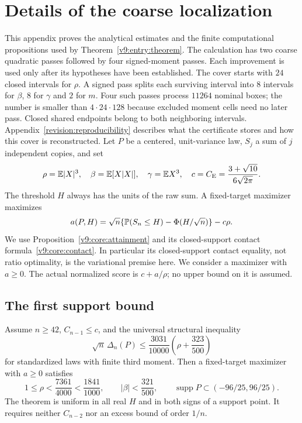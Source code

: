 \section{Details of the coarse localization}\label{revision:entry-details}

This appendix proves the analytical estimates and the finite
computational propositions used by Theorem~\ref{v9:entry:theorem}. The calculation has
two coarse quadratic passes followed by four signed-moment passes.
Each improvement is used only after its hypotheses have been established.
The cover starts with $24$ closed intervals for $\rho$. A signed pass
splits each surviving interval into $8$ intervals for $\beta$, $8$ for
$\gamma$ and $2$ for $m$. Four such passes process $11264$ nominal boxes;
the number is smaller than $4\cdot24\cdot128$ because excluded moment
cells need no later pass. Closed shared endpoints belong to both
neighboring intervals. Appendix~\ref{revision:reproducibility} describes
what the certificate stores and how this cover is reconstructed.
Let $P$ be a centered,
unit-variance law, $S_j$ a sum of $j$ independent copies, and set
\[
 \rho=\mathbb E|X|^3,\quad \beta=\mathbb E[X|X|],\quad \gamma=\mathbb E X^3,
 \quad c=C_{\mathrm E}=\frac{3+\sqrt{10}}{6\sqrt{2\pi}}.
\]
The threshold $H$ always has the units of the raw sum. A fixed-target
maximizer maximizes
\[
 a(P,H)=\sqrt n\{\mathbb P(S_n\le H)-\Phi(H/\sqrt n)\}-c\rho.
\]
We use Proposition~\ref{v9:core:attainment} and its closed-support
contact formula~\eqref{v9:core:contact}. In particular its closed-support contact
equality, not ratio optimality, is the variational premise here. We consider
a maximizer with $a\ge0$. The actual normalized score is $c+a/\rho$;
no upper bound on it is assumed.

\subsection{The first support bound}
\begin{theorem}\label{v9:entry:initial}\label{v9:entry:initial-support}
Assume $n\ge42$, $C_{n-1}\le c$, and the universal structural inequality
\begin{equation}\label{v9:entry:structural}
 \sqrt n\,\Delta_n(P)\le\frac{3031}{10000}
                  \left(\rho+\frac{323}{500}\right)
\end{equation}
for standardized laws with finite third moment. Then a fixed-target
maximizer with $a\ge0$ satisfies
\begin{equation}\label{v9:entry:entry}
 1\le\rho<\frac{7361}{4000}<\frac{1841}{1000},\qquad
 |\beta|<\frac{321}{500},\qquad
 \operatorname{supp}P\subset(-96/25,96/25).
\end{equation}
The theorem is uniform in all real $H$ and in both signs of a support
point. It requires neither $C_{n-2}$ nor an excess bound of order $1/n$.
\end{theorem}

